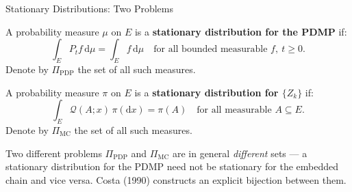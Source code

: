 \begin{frame}{Stationary Distributions: Two Problems}

  \begin{definition}
    A probability measure $\mu$ on $E$ is a \textbf{stationary
    distribution for the PDMP} if:
    \[
      \int_E P_t f\,\mathrm{d}\mu = \int_E f\,\mathrm{d}\mu
      \quad \text{for all bounded measurable } f,\ t \geq 0.
    \]
    Denote by $\Pi_{\mathrm{PDP}}$ the set of all such measures.
  \end{definition}

  \bigskip
  \begin{definition}
    A probability measure $\pi$ on $E$ is a \textbf{stationary
    distribution for $\{Z_k\}$} if:
    \[
      \int_E \mathcal{Q}(A;x)\,\pi(\mathrm{d}x) = \pi(A)
      \quad \text{for all measurable } A \subseteq E.
    \]
    Denote by $\Pi_{\mathrm{MC}}$ the set of all such measures.
  \end{definition}

  \bigskip
  \begin{alertblock}{Two different problems}
    $\Pi_{\mathrm{PDP}}$ and $\Pi_{\mathrm{MC}}$ are in general
    \emph{different} sets --- a stationary distribution for the
    PDMP need not be stationary for the embedded chain and vice
    versa. Costa (1990) constructs an explicit bijection between
    them.
  \end{alertblock}

\end{frame}

